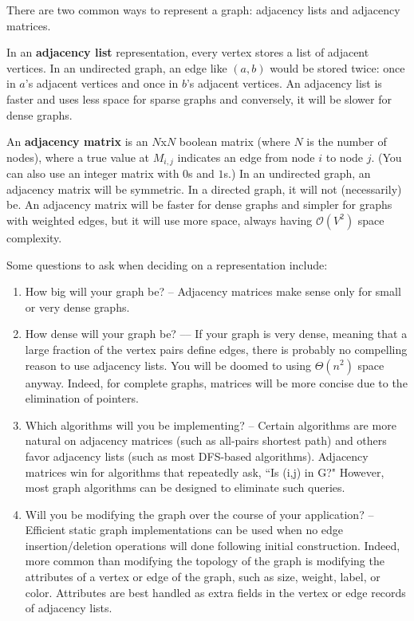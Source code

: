 \documentclass{article}
\newcommand{\bigO}{\mathcal{O}}
\begin{document}
    There are two common ways to represent a graph: adjacency lists and adjacency matrices. 
    
    In an \textbf{adjacency list} representation, every vertex stores a list of adjacent vertices. In an undirected graph, an edge like $(a, b)$ would be stored twice: once in $a$'s adjacent vertices and once in $b$'s adjacent vertices. An adjacency list is faster and uses less space for sparse graphs and conversely, it will be slower for dense graphs.
    
    An \textbf{adjacency matrix} is an $N$x$N$ boolean matrix (where $N$ is the number of nodes), where a true value at $M_{i,j}$ indicates an edge from node $i$ to node $j$. (You can also use an integer matrix with $0$s and $1$s.) In an undirected graph, an adjacency matrix will be symmetric. In a directed graph, it will not (necessarily) be. An adjacency matrix will be faster for dense graphs and simpler for graphs with weighted edges, but it will use more space, always having $\bigO(V^2)$ space complexity.
    
    Some questions to ask when deciding on a representation include:
    \begin{enumerate}
        \item How big will your graph be? – Adjacency matrices make sense only for small or very dense graphs.
        \item How dense will your graph be? –– If your graph is very dense, meaning that a large fraction of the vertex pairs define edges, there is probably no compelling reason to use adjacency lists. You will be doomed to using $\Theta(n^2)$ space anyway. Indeed, for complete graphs, matrices will be more concise due to the elimination of pointers.
        \item Which algorithms will you be implementing? – Certain algorithms are more natural on adjacency matrices (such as all-pairs shortest path) and others favor adjacency lists (such as most DFS-based algorithms). Adjacency matrices win for algorithms that repeatedly ask, ``Is (i,j) in G?" However, most graph algorithms can be designed to eliminate such queries.
        \item Will you be modifying the graph over the course of your application? – Efficient static graph implementations can be used when no edge insertion/deletion operations will done following initial construction. Indeed, more common than modifying the topology of the graph is modifying the attributes of a vertex or edge of the graph, such as size, weight, label, or color. Attributes are best handled as extra fields in the vertex or edge records of adjacency lists.
    \end{enumerate}
    
\end{document}
